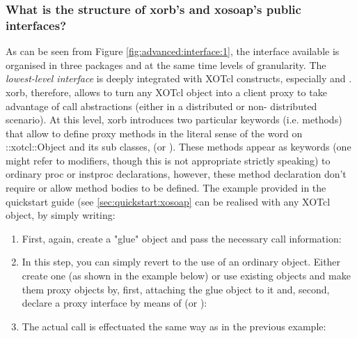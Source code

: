   \subsubsection{What is the structure of xorb's and xosoap's public interfaces?}\label{sec:advanced:interface:what}
As can be seen from Figure \ref{fig:advanced:interface:1}, the interface available is organised in three 
packages and at the same time levels of granularity. The \emph{lowest-level interface} is deeply 
integrated with XOTcl constructs, especially  and . xorb, therefore, allows to turn 
any XOTcl object into a client proxy to take advantage of call abstractions (either in a distributed or non-
distributed scenario). At this level, xorb introduces two particular keywords (i.e. methods) that allow to 
define proxy methods in the literal sense of the word on ::xotcl::Object and its sub classes, 
(or ). These methods appear as keywords (one might refer to modifiers, though this is 
not appropriate strictly speaking) to ordinary proc or instproc declarations, however, these method 
declaration don't require or allow method bodies to be defined. The example provided in the quickstart 
guide (see \ref{sec:quickstart:xosoap} can be realised with any XOTcl object, by simply writing:
  \begin{enumerate}
\item First, again, create a "glue" object and pass the necessary call information: 
\item In this step, you can simply revert to the use of an ordinary object. Either create one (as shown in the example below) or use existing objects and make them proxy objects by, first, attaching the glue object to it and, second, declare a proxy interface by means of  (or ):


\item The actual call is effectuated the same way as in the previous example:

  \end{enumerate}
